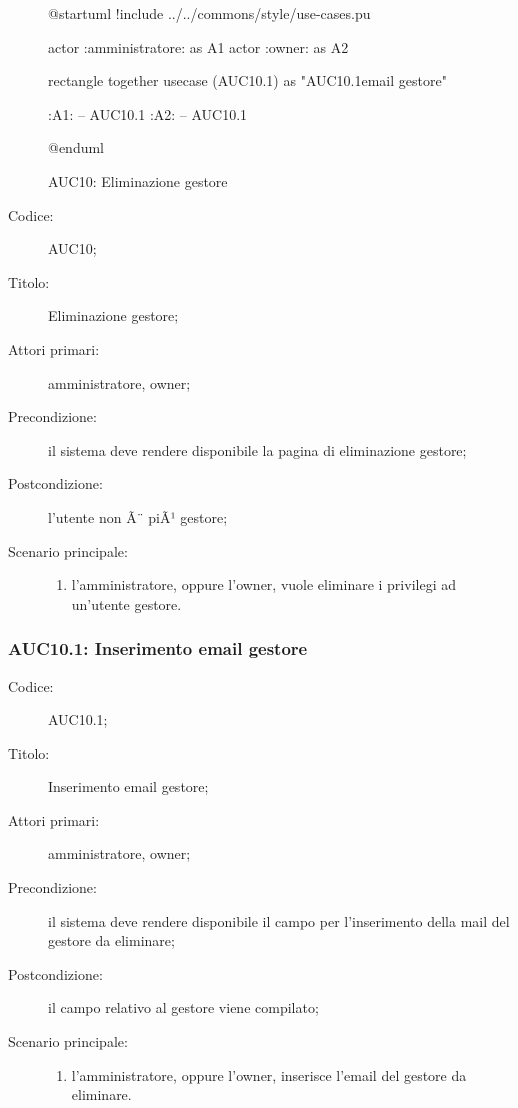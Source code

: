 \documentclass[../../../analisi-dei-requisiti.tex]{subfiles}
\begin{document}
\begin{figure}[H]
  \centering
  \begin{plantuml}
  @startuml
  !include ../../commons/style/use-cases.pu

  actor :amministratore: as A1
  actor :owner: as A2


  rectangle {
    together {
      usecase (AUC10.1) as "AUC10.1\nInserimento email gestore"
    }
  }

  :A1: -- AUC10.1
  :A2: -- AUC10.1

  @enduml
  \end{plantuml}
  \caption{AUC10: Eliminazione gestore}%
  \label{fig:AUC10}
\end{figure}

\begin{description}
  \item[Codice:] AUC10;
  \item[Titolo:] Eliminazione gestore;
  \item[Attori primari:] amministratore, owner;
  \item[Precondizione:] il sistema deve rendere disponibile la pagina di eliminazione gestore;
  \item[Postcondizione:] l'utente non Ã¨ piÃ¹ gestore;
  \item[Scenario principale:]
  \begin{enumerate}
    \item l'amministratore, oppure l'owner, vuole eliminare i privilegi ad un'utente gestore.
  \end{enumerate}
\end{description}

\subsubsection{AUC10.1: Inserimento email gestore}%
\label{subs:AUC10.1}
\begin{description}
  \item[Codice:] AUC10.1;
  \item[Titolo:] Inserimento email gestore;
  \item[Attori primari:] amministratore, owner;
  \item[Precondizione:] il sistema deve rendere disponibile il campo per l'inserimento della mail del gestore da eliminare;
  \item[Postcondizione:] il campo relativo al gestore viene compilato;
  \item[Scenario principale:]
  \begin{enumerate}
    \item l'amministratore, oppure l'owner, inserisce l'email del gestore da eliminare.
  \end{enumerate}
\end{description}
\end{document}
